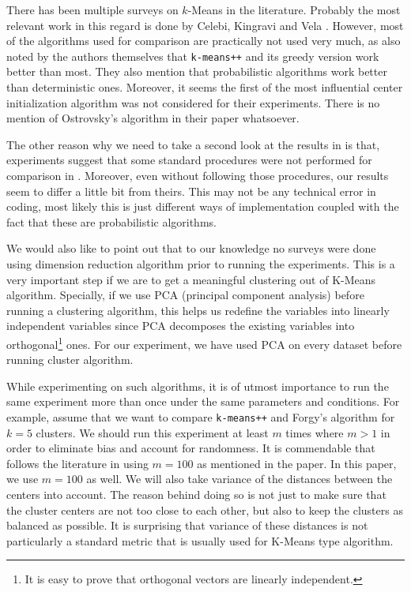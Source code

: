 \documentclass[10pt, leqno]{article}
\begin{document}
	There has been multiple surveys on $k$-Means in the literature. Probably the most relevant work in this regard is done by Celebi, Kingravi and Vela \cite{celebi}. However, most of the algorithms used for comparison are practically not used very much, as also noted by the authors themselves that \texttt{k-means++} and its greedy version work better than most. They also mention that probabilistic algorithms work better than deterministic ones. Moreover, it seems the first of the most influential center initialization algorithm \cite{ostrovsky} was not considered for their experiments. There is no mention of Ostrovsky's algorithm in their paper whatsoever.
	
	The other reason why we need to take a second look at the results in \cite{kmeans++} is that, experiments suggest that some standard procedures were not performed for comparison in \cite{kmeans++}. Moreover, even without following those procedures, our results seem to differ a little bit from theirs. This may not be any technical error in coding, most likely this is just different ways of implementation coupled with the fact that these are probabilistic algorithms.
	
	We would also like to point out that to our knowledge no surveys were done using dimension reduction algorithm prior to running the experiments. This is a very important step if we are to get a meaningful clustering out of K-Means algorithm. Specially, if we use PCA (principal component analysis) before running a clustering algorithm, this helps us redefine the variables into linearly independent variables since PCA decomposes the existing variables into orthogonal\footnote{It is easy to prove that orthogonal vectors are linearly independent.} ones. For our experiment, we have used PCA on every dataset before running cluster algorithm.
	
	While experimenting on such algorithms, it is of utmost importance to run the same experiment more than once under the same parameters and conditions. For example, assume that we want to compare \texttt{k-means++} and Forgy's algorithm \cite{forgy} for $k=5$ clusters. We should run this experiment at least $m$ times where $m>1$ in order to eliminate bias and account for randomness. It is commendable that \cite{celebi} follows the literature in using $m=100$ as mentioned in the paper. In this paper, we use $m=100$ as well. We will also take variance of the distances between the centers into account. The reason behind doing so is not just to make sure that the cluster centers are not too close to each other, but also to keep the clusters as balanced as possible. It is surprising that variance of these distances is not particularly a standard metric that is usually used for K-Means type algorithm. 
	
\end{document}
